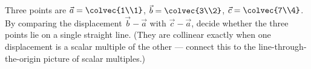 \begin{exercise}
\label{ch02:exr-collinear}
Three points are $\vec{a}=\colvec{1\\1}$, $\vec{b}=\colvec{3\\2}$, $\vec{c}=\colvec{7\\4}$.
By comparing the displacement $\vec{b}-\vec{a}$ with $\vec{c}-\vec{a}$, decide whether the
three points lie on a single straight line. (They are collinear exactly when one
displacement is a scalar multiple of the other --- connect this to the line-through-the-origin
picture of scalar multiples.)
\end{exercise}
